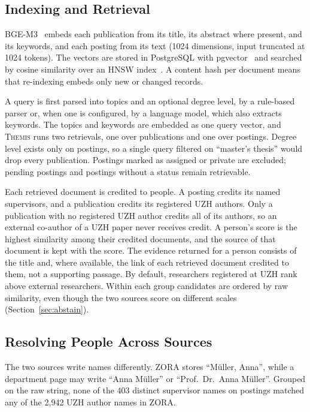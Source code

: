 \documentclass[sigconf,nonacm]{acmart}
\newcommand{\sys}{\textsc{Themis}}
\begin{document}
\subsection{Indexing and Retrieval}

BGE-M3~\cite{chen2024m3} embeds each publication from its title, its abstract where present, and its keywords, and each posting from its text (1024 dimensions, input truncated at 1024 tokens). The vectors are stored in PostgreSQL with pgvector~\cite{pgvector} and searched by cosine similarity over an HNSW index~\cite{malkov2020hnsw}. A content hash per document means that re-indexing embeds only new or changed records.

A query is first parsed into topics and an optional degree level, by a rule-based parser or, when one is configured, by a language model, which also extracts keywords. The topics and keywords are embedded as one query vector, and \sys{} runs two retrievals, one over publications and one over postings. Degree level exists only on postings, so a single query filtered on ``master's thesis'' would drop every publication. Postings marked as assigned or private are excluded; pending postings and postings without a status remain retrievable.

Each retrieved document is credited to people. A posting credits its named supervisors, and a publication credits its registered UZH authors. Only a publication with no registered UZH author credits all of its authors, so an external co-author of a UZH paper never receives credit. A person's score is the highest similarity among their credited documents, and the source of that document is kept with the score. The evidence returned for a person consists of the title and, where available, the link of each retrieved document credited to them, not a supporting passage. By default, researchers registered at UZH rank above external researchers. Within each group candidates are ordered by raw similarity, even though the two sources score on different scales (Section~\ref{sec:abstain}).

\subsection{Resolving People Across Sources}\label{sec:identity}

The two sources write names differently. ZORA stores ``M\"uller, Anna'', while a department page may write ``Anna M\"uller'' or ``Prof.\ Dr.\ Anna M\"uller''. Grouped on the raw string, none of the 403 distinct supervisor names on postings matched any of the 2,942 UZH author names in ZORA.
\end{document}
